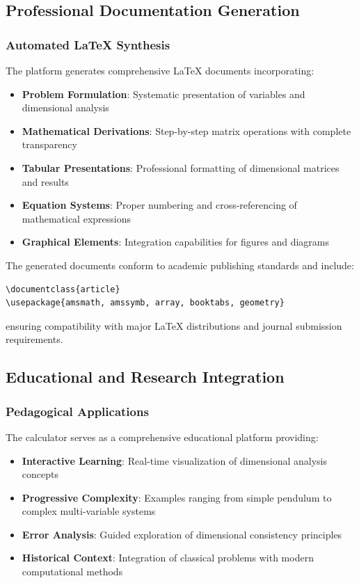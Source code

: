\documentclass[
	11pt, %
	fleqn, %
	a4paper, %
]{LegrandOrangeBook}
\begin{document}
\subsection{Professional Documentation Generation}
\subsubsection{Automated LaTeX Synthesis}
The platform generates comprehensive LaTeX documents incorporating:
\begin{itemize}
    \item \textbf{Problem Formulation}: Systematic presentation of variables and dimensional analysis
    \item \textbf{Mathematical Derivations}: Step-by-step matrix operations with complete transparency
    \item \textbf{Tabular Presentations}: Professional formatting of dimensional matrices and results
    \item \textbf{Equation Systems}: Proper numbering and cross-referencing of mathematical expressions
    \item \textbf{Graphical Elements}: Integration capabilities for figures and diagrams
\end{itemize}

The generated documents conform to academic publishing standards and include:
\begin{verbatim}
\documentclass{article}
\usepackage{amsmath, amssymb, array, booktabs, geometry}
\end{verbatim}
ensuring compatibility with major LaTeX distributions and journal submission requirements.

\subsection{Educational and Research Integration}
\subsubsection{Pedagogical Applications}
The calculator serves as a comprehensive educational platform providing:
\begin{itemize}
    \item \textbf{Interactive Learning}: Real-time visualization of dimensional analysis concepts
    \item \textbf{Progressive Complexity}: Examples ranging from simple pendulum to complex multi-variable systems
    \item \textbf{Error Analysis}: Guided exploration of dimensional consistency principles
    \item \textbf{Historical Context}: Integration of classical problems with modern computational methods
\end{itemize}
\end{document}
